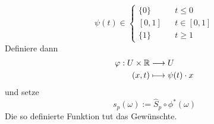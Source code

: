 \begin{Beweis}{}
\begin{itemize}
	\[ \psi(t) \in
	\left\lbrace
	\begin{aligned}
	\{0\} && t \leq 0\\
	[0,1] && t \in [0,1]\\
	\{1\} && t \geq 1
	\end{aligned}
	\right.
	 \]
	 Definiere dann
	 \begin{align*}
	 \varphi : U \times \mathbb{R} &\overset{}{\longrightarrow} U\\
	 (x,t) & \longmapsto \psi(t) \cdot x
	 \end{align*}
	 und setze
	 \[ s_p(\omega) := \widehat{S}_p \circ \phi^*(\omega) \]
	 Die so definierte Funktion tut das Gewünschte.
\end{itemize}
\end{Beweis}
